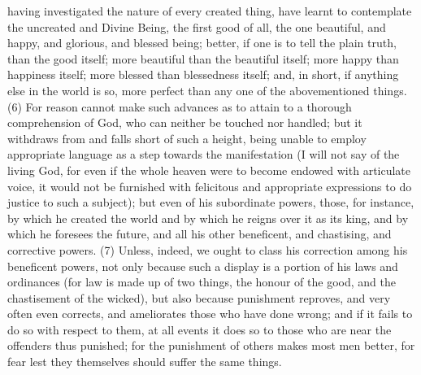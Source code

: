 having investigated the nature of every created thing, have learnt to contemplate the uncreated
and Divine Being, the first good of all, the one beautiful, and happy, and glorious, and blessed
being; better, if one is to tell the plain truth, than the good itself; more beautiful than the beautiful
itself; more happy than happiness itself; more blessed than blessedness itself; and, in short, if
anything else in the world is so, more perfect than any one of the abovementioned things. (6) For
reason cannot make such advances as to attain to a thorough comprehension of God, who can
neither be touched nor handled; but it withdraws from and falls short of such a height, being unable
to employ appropriate language as a step towards the manifestation (I will not say of the living God,
for even if the whole heaven were to become endowed with articulate voice, it would not be
furnished with felicitous and appropriate expressions to do justice to such a subject); but even of
his subordinate powers, those, for instance, by which he created the world and by which he reigns
over it as its king, and by which he foresees the future, and all his other beneficent, and chastising,
and corrective powers. (7) Unless, indeed, we ought to class his correction among his beneficent
powers, not only because such a display is a portion of his laws and ordinances (for law is made
up of two things, the honour of the good, and the chastisement of the wicked), but also because
punishment reproves, and very often even corrects, and ameliorates those who have done wrong;
and if it fails to do so with respect to them, at all events it does so to those who are near the
offenders thus punished; for the punishment of others makes most men better, for fear lest they
themselves should suffer the same things.

